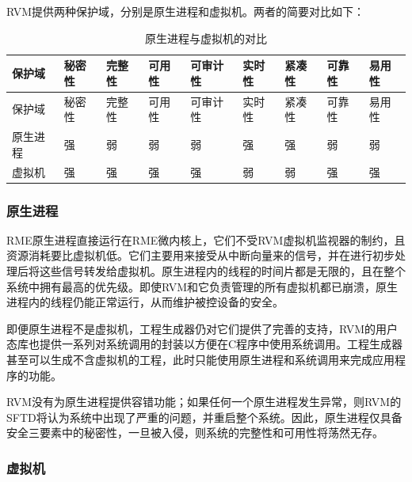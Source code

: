 RVM提供两种保护域，分别是原生进程和虚拟机。两者的简要对比如下：

\begin{xltabular}{\textwidth}{@{}>{\hsize\raggedright\arraybackslash}X>{\hsize\raggedright\arraybackslash}X>{\hsize\raggedright\arraybackslash}X>{\hsize\raggedright\arraybackslash}X>{\hsize\raggedright\arraybackslash}X>{\hsize\raggedright\arraybackslash}X>{\hsize\raggedright\arraybackslash}X>{\hsize\raggedright\arraybackslash}X>{\hsize\raggedright\arraybackslash}X@{}}
\caption{原生进程与虚拟机的对比}\label{tab:2-2}\\
\toprule
保护域 & 秘密性 & 完整性 & 可用性 & 可审计性 & 实时性 & 紧凑性 & 可靠性
& 易用性\tabularnewline
\endfirsthead
\toprule
保护域 & 秘密性 & 完整性 & 可用性 & 可审计性 & 实时性 & 紧凑性 & 可靠性
& 易用性\tabularnewline
\midrule
\endhead
\bottomrule
\endlastfoot
原生进程 & 强 & 弱 & 弱 & 弱 & 强 & 强 & 弱 & 弱\tabularnewline
虚拟机 & 强 & 强 & 强 & 强 & 弱 & 弱 & 强 & 强\tabularnewline
\end{xltabular}

\subsubsection{原生进程}\label{subsubsec:2-1-3-1}

RME原生进程直接运行在RME微内核上，它们不受RVM虚拟机监视器的制约，且资源消耗要比虚拟机低。它们主要用来接受从中断向量来的信号，并在进行初步处理后将这些信号转发给虚拟机。原生进程内的线程的时间片都是无限的，且在整个系统中拥有最高的优先级。即使RVM和它负责管理的所有虚拟机都已崩溃，原生进程内的线程仍能正常运行，从而维护被控设备的安全。

即便原生进程不是虚拟机，工程生成器仍对它们提供了完善的支持，RVM的用户态库也提供一系列对系统调用的封装以方便在C程序中使用系统调用。工程生成器甚至可以生成不含虚拟机的工程，此时只能使用原生进程和系统调用来完成应用程序的功能。

RVM没有为原生进程提供容错功能；如果任何一个原生进程发生异常，则RVM的SFTD将认为系统中出现了严重的问题，并重启整个系统。因此，原生进程仅具备安全三要素中的秘密性，一旦被入侵，则系统的完整性和可用性将荡然无存。

\subsubsection{虚拟机}\label{subsubsec:2-1-3-2}


